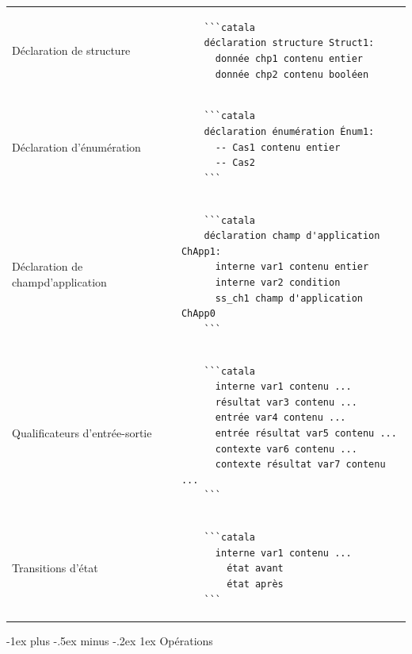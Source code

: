 \documentclass{article}
\makeatletter
\newcommand\articlenormalsize{\fontsize{10pt}{12pt}\selectfont}
\renewcommand{\section}{\@startsection{section}{1}{0mm}%
                                {-1ex plus -.5ex minus -.2ex}%
                                {1ex}%
                                {\normalfont\articlenormalsize\bfseries}}
\newenvironment{catala}{%
  \VerbatimEnvironment
  \let\FV@ListVSpace\relax
  \begin{verbatim}}%
 {\end{verbatim}}
\makeatother
\begin{document}
\begin{multicols}{3}
\begin{tabular}{@{}p{\cola}p{\colb}@{}}
  Déclaration de structure &
  \begin{catala}
    ```catala
    déclaration structure Struct1:
      donnée chp1 contenu entier
      donnée chp2 contenu booléen
  \end{catala}
  \\
  Déclaration d'énumération & \begin{catala}
    ```catala
    déclaration énumération Énum1:
      -- Cas1 contenu entier
      -- Cas2
    ```
  \end{catala}
  \\
  Déclaration de champ\newline d'application & \begin{catala}
    ```catala
    déclaration champ d'application ChApp1:
      interne var1 contenu entier
      interne var2 condition
      ss_ch1 champ d'application ChApp0
    ```
  \end{catala}
  \\
  Qualificateurs d'entrée-\newline sortie & \begin{catala}
    ```catala
      interne var1 contenu ...
      résultat var3 contenu ...
      entrée var4 contenu ...
      entrée résultat var5 contenu ...
      contexte var6 contenu ...
      contexte résultat var7 contenu ...
    ```
  \end{catala}
  \\
  Transitions d'état & \begin{catala}
    ```catala
      interne var1 contenu ...
        état avant
        état après
    ```
  \end{catala}
  \\
\end{tabular}

\section{Opérations}


\end{multicols}
\end{document}
